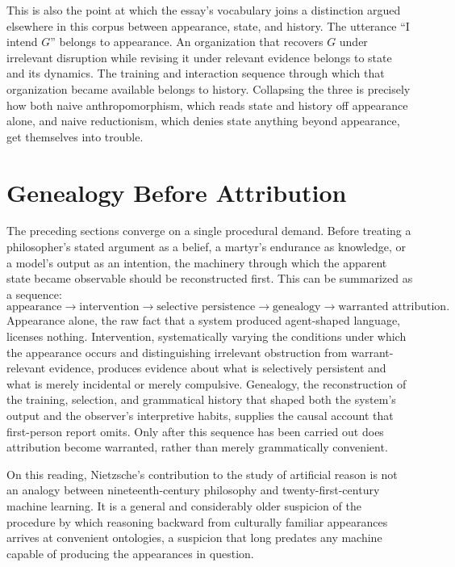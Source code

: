 \documentclass[11pt]{article}
\begin{document}
This is also the point at which the essay's vocabulary joins a distinction argued elsewhere in this corpus between appearance, state, and history. The utterance ``I intend \(G\)'' belongs to appearance. An organization that recovers \(G\) under irrelevant disruption while revising it under relevant evidence belongs to state and its dynamics. The training and interaction sequence through which that organization became available belongs to history. Collapsing the three is precisely how both naive anthropomorphism, which reads state and history off appearance alone, and naive reductionism, which denies state anything beyond appearance, get themselves into trouble.

\section{Genealogy Before Attribution}

The preceding sections converge on a single procedural demand. Before treating a philosopher's stated argument as a belief, a martyr's endurance as knowledge, or a model's output as an intention, the machinery through which the apparent state became observable should be reconstructed first. This can be summarized as a sequence:
\[
\text{appearance} \rightarrow \text{intervention} \rightarrow \text{selective persistence} \rightarrow \text{genealogy} \rightarrow \text{warranted attribution}.
\]
Appearance alone, the raw fact that a system produced agent-shaped language, licenses nothing. Intervention, systematically varying the conditions under which the appearance occurs and distinguishing irrelevant obstruction from warrant-relevant evidence, produces evidence about what is selectively persistent and what is merely incidental or merely compulsive. Genealogy, the reconstruction of the training, selection, and grammatical history that shaped both the system's output and the observer's interpretive habits, supplies the causal account that first-person report omits. Only after this sequence has been carried out does attribution become warranted, rather than merely grammatically convenient.

On this reading, Nietzsche's contribution to the study of artificial reason is not an analogy between nineteenth-century philosophy and twenty-first-century machine learning. It is a general and considerably older suspicion of the procedure by which reasoning backward from culturally familiar appearances arrives at convenient ontologies, a suspicion that long predates any machine capable of producing the appearances in question.
\end{document}
